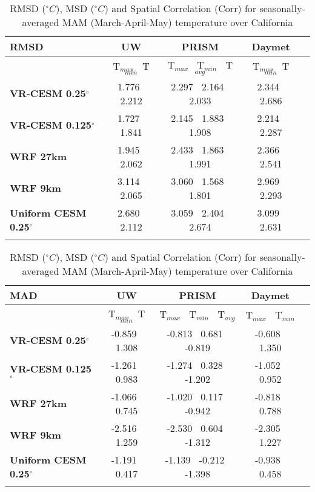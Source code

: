 \documentclass[ms]{agutexSI}
\begin{document}
\begin{table}
\begin{center}
\caption{RMSD ($^\circ C$), MSD ($^\circ C$) and Spatial Correlation (Corr) for seasonally-averaged MAM (March-April-May) temperature over California} 
\begin{tabular}{lcccc}
\hline \textbf{RMSD} & \textbf{UW}  & \textbf{PRISM} & \textbf{Daymet} \\
\hline $    $ & T$_{max}$ $\     $  T$_{min}$ & T$_{max}$ $\     $  T$_{min}$ $\     $ T$_{avg}$& T$_{max}$ $\     $  T$_{min}$\\
\hline \textbf{VR-CESM 0.25$^\circ$} & 1.776 $\ $ 2.212 & 2.297 $\ $ 2.164 $\ $ 2.033 & 2.344 $\ $ 2.686 \\
\textbf{VR-CESM 0.125$^\circ$} & 1.727 $\ $ 1.841 & 2.145 $\ $ 1.883 $\ $ 1.908 & 2.214 $\ $ 2.287 \\
\textbf{WRF 27km} & 1.945 $\ $ 2.062 & 2.433 $\ $ 1.863 $\ $ 1.991 & 2.366 $\ $ 2.541 \\
\textbf{WRF 9km} & 3.114 $\ $ 2.065 & 3.060 $\ $ 1.568 $\ $ 1.801 & 2.969 $\ $ 2.293 \\
\textbf{Uniform CESM 0.25$^\circ$} & 2.680 $\ $ 2.112 & 3.059 $\ $ 2.404 $\ $ 2.674 & 3.099 $\ $ 2.631 \\
\hline
\\
\end{tabular}

\begin{tabular}{lcccc}
\hline \textbf{MAD} & \textbf{UW}  & \textbf{PRISM} & \textbf{Daymet} \\
\hline $    $ & T$_{max}$ $\     $  T$_{min}$ & T$_{max}$ $\     $  T$_{min}$ $\     $ T$_{avg}$& T$_{max}$ $\     $  T$_{min}$\\
\hline \textbf{VR-CESM 0.25$^\circ$} & -0.859 $\ $ 1.308 & -0.813 $\ $ 0.681 $\ $ -0.819 & -0.608 $\ $ 1.350 \\
\textbf{VR-CESM 0.125$^\circ$} & -1.261 $\ $ 0.983 & -1.274 $\ $ 0.328 $\ $ -1.202 & -1.052 $\ $ 0.952 \\
\textbf{WRF 27km} & -1.066 $\ $ 0.745 & -1.020 $\ $ 0.117 $\ $ -0.942 & -0.818 $\ $ 0.788 \\
\textbf{WRF 9km} & -2.516 $\ $ 1.259 & -2.530 $\ $ 0.604 $\ $ -1.312 & -2.305 $\ $ 1.227 \\
\textbf{Uniform CESM 0.25$^\circ$} & -1.191 $\ $ 0.417 & -1.139 $\ $ -0.212 $\ $ -1.398 & -0.938 $\ $ 0.458 \\
\hline
\\
\end{tabular}


\end{center}
\end{table}
\end{document}
